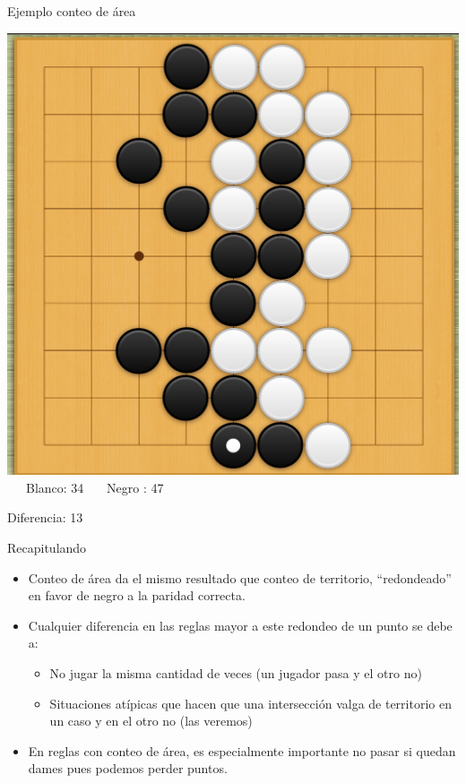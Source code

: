 \documentclass{beamer}
\begin{document}
\begin{frame}{Ejemplo conteo de área}
  
    \includegraphics[scale=0.17]{ejemplo-conteo-negroult.png} \ \ \ Blanco: 34 \ \ \ Negro : 47  
  
  Diferencia: 13
  
\end{frame}

\begin{frame}{Recapitulando}

    \begin{itemize}
        \item Conteo de área da el mismo resultado que conteo de territorio, ``redondeado'' en favor de negro a la paridad correcta.
        \item Cualquier diferencia en las reglas mayor a este redondeo de un punto se debe a:
           \begin{itemize}
              \item No jugar la misma cantidad de veces (un jugador pasa y el otro no)
              \item Situaciones atípicas que hacen que una intersección valga de territorio en un caso y en el otro no (las veremos)
           \end{itemize}
        \item En reglas con conteo de área, es especialmente importante no pasar si quedan dames pues podemos perder puntos.
    \end{itemize}
  
\end{frame}
\end{document}
